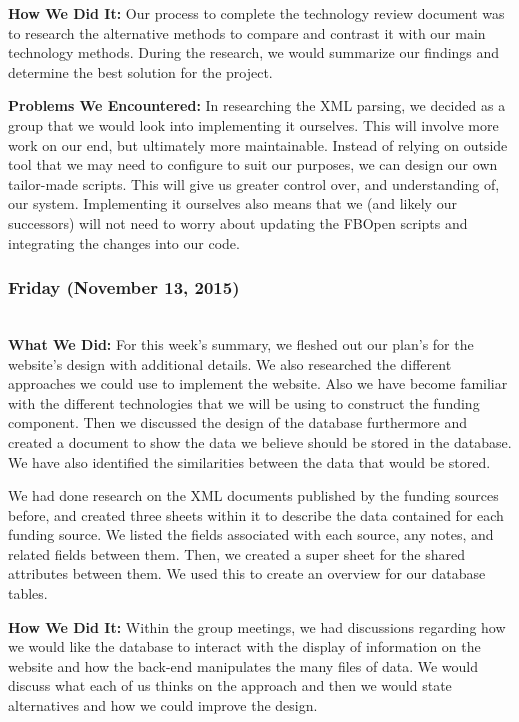 \documentclass[onecolumn]{IEEEtran}
\begin{document}
    \textbf{How We Did It: } 
    Our process to complete the technology review document was to research the alternative methods to compare and contrast it with our main technology methods. During the research, we would summarize our findings and determine the best solution for the project.  
    
    \textbf{Problems We Encountered: } 
    In researching the XML parsing, we decided as a group that we would look into implementing it ourselves. This will involve more work on our end, but ultimately more maintainable. Instead of relying on outside tool that we may need to configure to suit our purposes, we can design our own tailor-made scripts. This will give us greater control over, and understanding of, our system. Implementing it ourselves also means that we (and likely our successors) will not need to worry about updating the FBOpen scripts and integrating the changes into our code.  

\subsubsection{Friday (November 13, 2015)} \hspace*{\fill} \\  
    \textbf{What We Did: }
    For this week's summary, we fleshed out our plan's for the website's design with additional details. We also researched the different approaches we could use to implement the website. Also we have become familiar with the different technologies that we will be using to construct the funding component. Then we discussed the design of the database furthermore and created a document to show the data we believe should be stored in the database. We have also identified the similarities between the data that would be stored.  
    
    We had done research on the XML documents published by the funding sources before, and created three sheets within it to describe the data contained for each funding source. We listed the fields associated with each source, any notes, and related fields between them. Then, we created a super sheet for the shared attributes between them. We used this to create an overview for our database tables.  
    
    \textbf{How We Did It: } 
    Within the group meetings, we had discussions regarding how we would like the database to interact with the display of information on the website and how the back-end manipulates the many files of data. We would discuss what each of us thinks on the approach and then we would state alternatives and how we could improve the design.  
\end{document}
